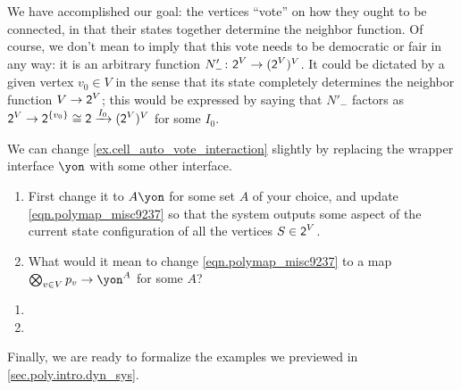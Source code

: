 \documentclass[Book-Poly]{subfiles}
\begin{document}
\begin{example}
We have accomplished our goal: the vertices ``vote'' on how they ought to be connected, in that their states together determine the neighbor function.
Of course, we don't mean to imply that this vote needs to be democratic or fair in any way: it is an arbitrary function $N'_-\colon \textsf{2}^V\to(\textsf{2}^V)^V$.
It could be dictated by a given vertex $v_0\in V$ in the sense that its state completely determines the neighbor function $V\to\textsf{2}^V$; this would be expressed by saying that $N'_-$ factors as $\textsf{2}^V\to\textsf{2}^{\{v_0\}}\cong\textsf{2}\xrightarrow{I_0}(\textsf{2}^V)^V$ for some $I_0$.
\end{example}

\begin{exercise}
We can change \cref{ex.cell_auto_vote_interaction} slightly by replacing the wrapper interface $\yon$ with some other interface.
\begin{enumerate}
	\item First change it to $A\yon$ for some set $A$ of your choice, and update \eqref{eqn.polymap_misc9237} so that the system outputs some aspect of the current state configuration of all the vertices $S\in\textsf{2}^V$.
	\item What would it mean to change \eqref{eqn.polymap_misc9237} to a map $\bigotimes_{v\in V}p_v\to\yon^A$ for some $A$?
\qedhere
\end{enumerate}
\begin{solution}
\begin{enumerate}
    \item
    \item
\end{enumerate}
\end{solution}
\end{exercise}

Finally, we are ready to formalize the examples we previewed in \cref{sec.poly.intro.dyn_sys}.
\end{document}

